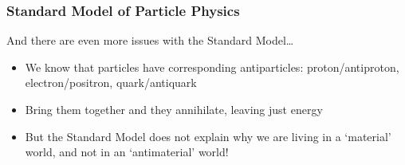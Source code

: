 \begin{frame}[t]
 \frametitle{Standard Model of Particle Physics}
 \begin{block}{And there are even more issues with the Standard Model\ldots}
  \begin{itemize}
   \item We know that particles have corresponding \alert{antiparticles}: proton/antiproton, electron/positron, quark/antiquark
   \item<+-> Bring them together and they annihilate, leaving just energy
   \item<+-> But the Standard Model does not explain why we are living in a `material' world, and not in an `antimaterial' world!
   \begin{center}
   \end{center}
  \end{itemize}
 \end{block}
\end{frame}
